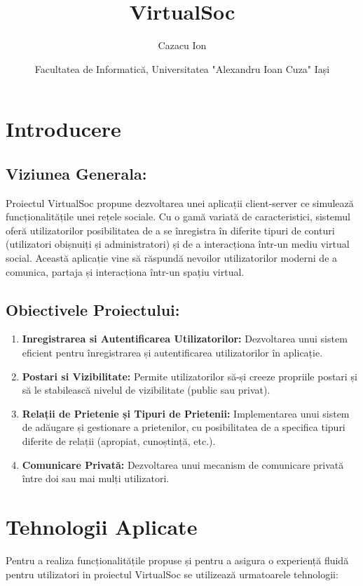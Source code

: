 \documentclass{article}
\title{VirtualSoc}
\author{Cazacu Ion}
\date{Facultatea de Informatică, Universitatea "Alexandru Ioan Cuza" Iași}
\begin{document}
\maketitle

\section{Introducere}
\subsection{ Viziunea Generala:}
Proiectul VirtualSoc  propune dezvoltarea unei aplicații client-server ce simulează funcționalitățile unei rețele sociale. Cu o gamă variată de caracteristici, sistemul oferă utilizatorilor posibilitatea de a se înregistra în diferite tipuri de conturi (utilizatori obișnuiți și administratori) și de a interacționa într-un mediu virtual social. Această aplicație vine să răspundă nevoilor utilizatorilor moderni de a comunica, partaja și interacționa într-un spațiu virtual.

\subsection{Obiectivele Proiectului:}
\begin{enumerate}
    \item \textbf{Inregistrarea si Autentificarea Utilizatorilor:} Dezvoltarea unui sistem eficient pentru înregistrarea și autentificarea utilizatorilor în aplicație.

    \item \textbf{Postari si Vizibilitate:} Permite utilizatorilor să-și creeze propriile postari și să le stabilească nivelul de vizibilitate (public sau privat).

    \item \textbf{Relații de Prietenie și Tipuri de Prietenii:} Implementarea unui sistem de adăugare și gestionare a prietenilor, cu posibilitatea de a specifica tipuri diferite de relații (apropiat, cunoștință, etc.).

    \item \textbf{Comunicare Privată:} Dezvoltarea unui mecanism de comunicare privată între doi sau mai mulți utilizatori.
\end{enumerate}

\section{Tehnologii Aplicate}
Pentru a realiza funcționalitățile propuse și pentru a asigura o experiență fluidă pentru utilizatori in proiectul VirtualSoc se utilizează urmatoarele tehnologii:
\end{document}
